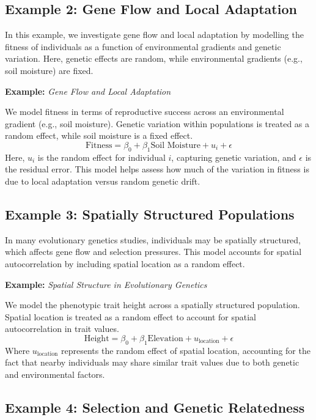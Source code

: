 \documentclass[12pt,a4paper]{article}
\newenvironment{example}[1][]
{\begin{basebox}[linecolor=uqgold]
\textbf{\color{uqgold}Example:} \textit{#1}\par\noindent\ignorespaces}
{\end{basebox}}
\begin{document}
\subsection{Example 2: Gene Flow and Local Adaptation}

In this example, we investigate gene flow and local adaptation by modelling the fitness of individuals as a function of environmental gradients and genetic variation. Here, genetic effects are random, while environmental gradients (e.g., soil moisture) are fixed.

\begin{example}[Gene Flow and Local Adaptation]
We model fitness in terms of reproductive success across an environmental gradient (e.g., soil moisture). Genetic variation within populations is treated as a random effect, while soil moisture is a fixed effect.
\[
\text{Fitness} = \beta_0 + \beta_1 \text{Soil Moisture} + u_i + \epsilon
\]
Here, \( u_i \) is the random effect for individual \( i \), capturing genetic variation, and \( \epsilon \) is the residual error. This model helps assess how much of the variation in fitness is due to local adaptation versus random genetic drift.
\end{example}

\subsection{Example 3: Spatially Structured Populations}

In many evolutionary genetics studies, individuals may be spatially structured, which affects gene flow and selection pressures. This model accounts for spatial autocorrelation by including spatial location as a random effect.

\begin{example}[Spatial Structure in Evolutionary Genetics]
We model the phenotypic trait height across a spatially structured population. Spatial location is treated as a random effect to account for spatial autocorrelation in trait values.
\[
\text{Height} = \beta_0 + \beta_1 \text{Elevation} + u_{\text{location}} + \epsilon
\]
Where \( u_{\text{location}} \) represents the random effect of spatial location, accounting for the fact that nearby individuals may share similar trait values due to both genetic and environmental factors.
\end{example}

\subsection{Example 4: Selection and Genetic Relatedness}
\end{document}
